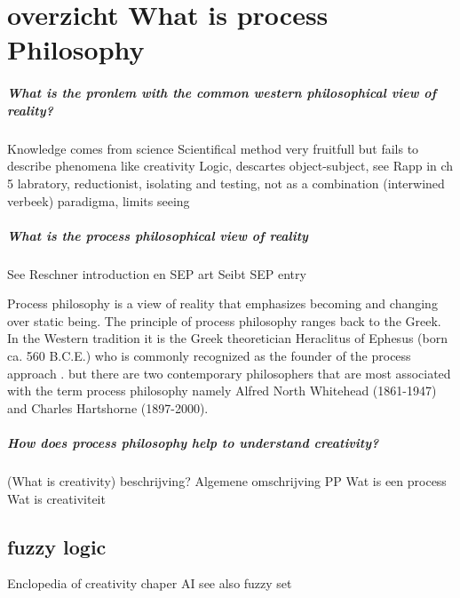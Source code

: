 \documentclass[a4paper]{Thesis}
\begin{document}
	


\chapter{overzicht What is process Philosophy}

\paragraph{What is the pronlem with the common western philosophical view of reality?}
Knowledge comes from science
Scientifical method very fruitfull but fails to describe phenomena like creativity
Logic, descartes object-subject, see Rapp in ch 5
labratory, reductionist, isolating and testing, not as a combination (interwined verbeek)
paradigma, limits seeing

\paragraph{What is the process philosophical view of reality}
See Reschner introduction en SEP art \cite{Rescher-2012-sep}
Seibt SEP entry \cite{Seibt-2013-sep}


Process philosophy is a view of reality that emphasizes becoming and changing over static being. The principle of process philosophy ranges back to the Greek.
In the Western tradition it is the Greek theoretician Heraclitus of Ephesus (born ca. 560 B.C.E.) who is commonly recognized as the founder of the process approach \cite{Seibt-2013-sep}. 
but there are two contemporary philosophers that are most associated with the term process philosophy namely Alfred North Whitehead (1861-1947) and Charles Hartshorne (1897-2000).



\paragraph{How does process philosophy help to understand creativity?}

\paragragph(What is creativity)
beschrijving?
Algemene omschrijving PP
Wat is een process
Wat is creativiteit




\section{fuzzy logic}
Enclopedia of creativity chaper AI
see also fuzzy set
\end{document}
